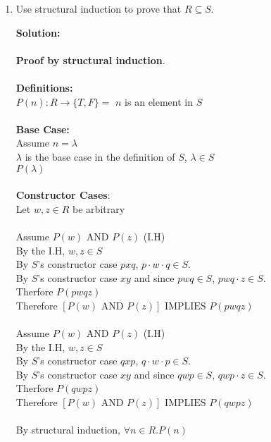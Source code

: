 \documentclass[11pt]{article}
\newcommand{\Implies}{\mbox{ IMPLIES }}
\newcommand{\And}{\mbox{ AND }}
\begin{document}
\begin{enumerate}
\item
\begin{question}
Use structural induction to prove that $R \subseteq S$.
\end{question}

\begin{solution}
{\bf Solution:}\\\\
{\bf  Proof by structural induction}.\\\\
{\bf Definitions: }\\
$P(n): R\rightarrow\{T,F\} = $ $n$ is an element in $S$\\\\
{\bf Base Case:}\\
\null\quad Assume $n=\lambda$\\
\null\quad $\lambda$ is the base case in the definition of $S$, $\lambda\in S$\\
\null\quad $P(\lambda)$\\\\
{\bf Constructor Cases}:\\
\null\quad Let $w,z\in R$ be arbitrary\\\\
\null\qquad Assume $P(w)\And P(z)$ (I.H)\\
\null\qquad By the I.H, $w,z\in S$\\
\null\qquad By $S$'s constructor case $pxq$, $p\cdot w\cdot q\in S$.\\
\null\qquad By $S$'s constructor case $xy$ and since $pwq\in S$, $pwq\cdot z\in S$.\\
\null\qquad Therfore $P(pwqz)$\\
\null\quad Therefore $[P(w)\And P(z)]\Implies P(pwqz)$\\\\
\null\qquad Assume $P(w)\And P(z)$ (I.H)\\
\null\qquad By the I.H, $w,z\in S$\\
\null\qquad By $S$'s constructor case $qxp$, $q\cdot w\cdot p\in S$.\\
\null\qquad By $S$'s constructor case $xy$ and since $qwp\in S$, $qwp\cdot z\in S$.\\
\null\qquad Therfore $P(qwpz)$\\
\null\quad Therefore $[P(w)\And P(z)]\Implies P(qwpz)$\\\\
By structural induction, $\forall n\in R. P(n)$\\\\


\end{solution}
\end{enumerate}
\end{document}
